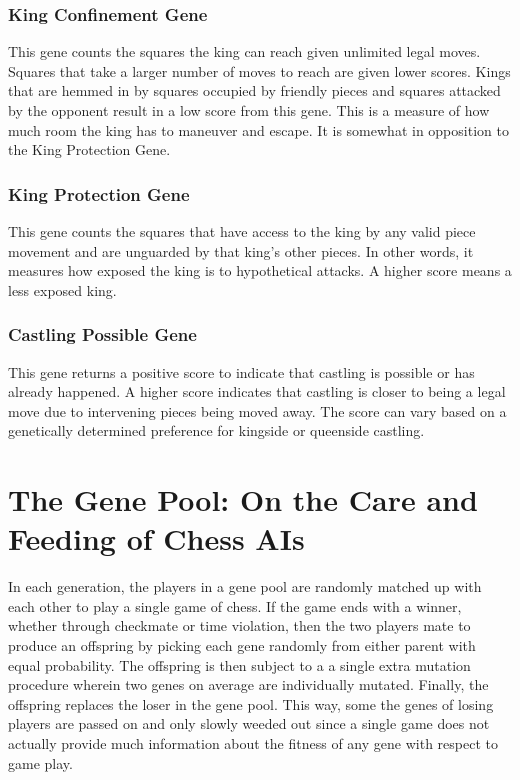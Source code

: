 \documentclass[letter]{article}
\renewcommand\_{\textunderscore\allowbreak}
\begin{document}
\subsubsection{King Confinement Gene}
This gene counts the squares the king can reach given unlimited legal moves. Squares that take a larger number of moves to reach are given lower scores. Kings that are hemmed in by squares occupied by friendly pieces and squares attacked by the opponent result in a low score from this gene. This is a measure of how much room the king has to maneuver and escape. It is somewhat in opposition to the King Protection Gene.

\subsubsection{King Protection Gene}
This gene counts the squares that have access to the king by any valid piece movement and are unguarded by that king's other pieces. In other words, it measures how exposed the king is to hypothetical attacks. A higher score means a less exposed king.

\subsubsection{Castling Possible Gene}
This gene returns a positive score to indicate that castling is possible or has already happened. A higher score indicates that castling is closer to being a legal move due to intervening pieces being moved away. The score can vary based on a genetically determined preference for kingside or queenside castling.




\section{The Gene Pool: On the Care and Feeding of Chess AIs}

In each generation, the players in a gene pool are randomly matched up with each other to play a single game of chess. If the game ends with a winner, whether through checkmate or time violation, then the two players mate to produce an offspring by picking each gene randomly from either parent with equal probability. The offspring is then subject to a a single extra mutation procedure wherein two genes on average are individually mutated. Finally, the offspring replaces the loser in the gene pool. This way, some the genes of losing players are passed on and only slowly weeded out since a single game does not actually provide much information about the fitness of any gene with respect to game play.
\end{document}
